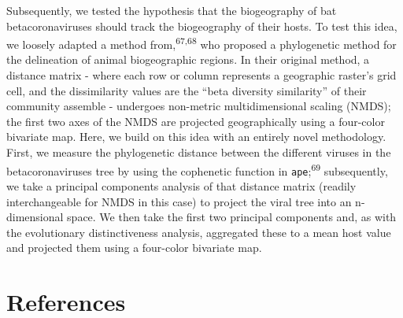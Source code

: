 \documentclass[11pt]{article}
\begin{document}
Subsequently, we tested the hypothesis that the biogeography of bat
betacoronaviruses should track the biogeography of their hosts. To test
this idea, we loosely adapted a method from,\textsuperscript{67,68} who
proposed a phylogenetic method for the delineation of animal
biogeographic regions. In their original method, a distance matrix -
where each row or column represents a geographic raster's grid cell, and
the dissimilarity values are the ``beta diversity similarity'' of their
community assemble - undergoes non-metric multidimensional scaling
(NMDS); the first two axes of the NMDS are projected geographically
using a four-color bivariate map. Here, we build on this idea with an
entirely novel methodology. First, we measure the phylogenetic distance
between the different viruses in the betacoronaviruses tree by using the
cophenetic function in \texttt{ape};\textsuperscript{69} subsequently,
we take a principal components analysis of that distance matrix (readily
interchangeable for NMDS in this case) to project the viral tree into an
n-dimensional space. We then take the first two principal components
and, as with the evolutionary distinctiveness analysis, aggregated these
to a mean host value and projected them using a four-color bivariate
map.

\newpage

\hypertarget{references}{%
\section*{References}\label{references}}
\end{document}
